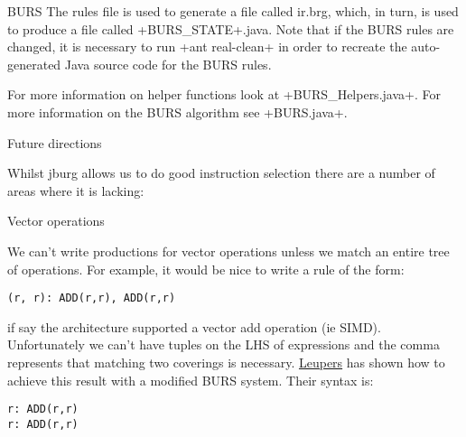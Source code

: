 \begin{section}{BURS}
The rules file is used to generate a file called ir.brg, which, in turn, is used to produce a file called \spverb+BURS_STATE+.java. Note that if the BURS rules are changed, it is necessary to run \spverb+ant real-clean+ in order to recreate the auto-generated Java source code for the BURS rules.

For more information on helper functions look at \spverb+BURS_Helpers.java+. For more information on the BURS algorithm see \spverb+BURS.java+.

\begin{subsection}{Future directions}

Whilst jburg allows us to do good instruction selection there are a number of areas where it is lacking:

\begin{subsubsection}{Vector operations}

We can't write productions for vector operations unless we match an entire tree of operations. For example, it would be nice to write a rule of the form:

\begin{lstlisting}
(r, r): ADD(r,r), ADD(r,r)
\end{lstlisting}

if say the architecture supported a vector add operation (ie SIMD). Unfortunately we can't have tuples on the LHS of expressions and the comma represents that matching two coverings is necessary. \href{http://doi.acm.org/10.1145/343647.343679}{Leupers} has shown how to achieve this result with a modified BURS system. Their syntax is:

\begin{lstlisting}
r: ADD(r,r)
r: ADD(r,r)
\end{lstlisting}

\end{subsubsection}

\end{subsection}

\end{section}
